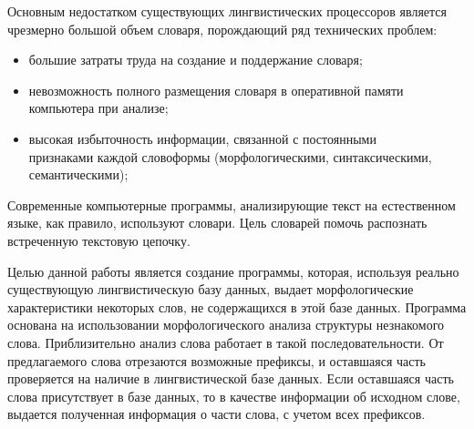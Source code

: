 Основным недостатком существующих лингвистических процессоров является чрезмерно большой объем словаря, порождающий ряд технических проблем:
\begin{itemize}
    \item большие затраты труда на создание и поддержание словаря;
    \item невозможность полного размещения словаря в оперативной памяти компьютера при анализе;
    \item высокая избыточность информации, связанной с постоянными  \\ признаками каждой словоформы (морфологическими, синтаксическими, семантическими);
\end{itemize}

Современные компьютерные программы, анализирующие текст на естественном языке, как правило, используют словари. Цель словарей помочь распознать встреченную текстовую цепочку.

Целью данной работы является создание программы, которая, используя реально существующую лингвистическую базу данных, выдает морфологические характеристики некоторых слов, не содержащихся в этой базе данных.
Программа основана на использовании морфологического анализа структуры незнакомого слова.
Приблизительно анализ слова работает в такой последовательности. От предлагаемого слова отрезаются возможные префиксы, и оставшаяся часть проверяется на наличие в лингвистической базе данных. Если оставшаяся часть слова присутствует в базе данных, то в качестве информации об исходном слове, выдается полученная информация о части слова, с учетом всех префиксов.

\clearpage